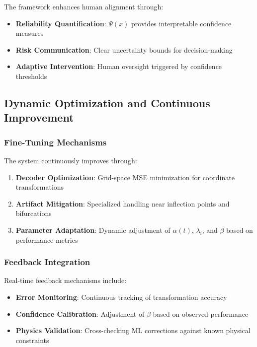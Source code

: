 The framework enhances human alignment through:
\begin{itemize}
    \item \textbf{Reliability Quantification}: $\Psi(x)$ provides interpretable confidence measures
    \item \textbf{Risk Communication}: Clear uncertainty bounds for decision-making
    \item \textbf{Adaptive Intervention}: Human oversight triggered by confidence thresholds
\end{itemize}

\subsection{Dynamic Optimization and Continuous Improvement}

\subsubsection{Fine-Tuning Mechanisms}

The system continuously improves through:
\begin{enumerate}
    \item \textbf{Decoder Optimization}: Grid-space MSE minimization for coordinate transformations
    \item \textbf{Artifact Mitigation}: Specialized handling near inflection points and bifurcations
    \item \textbf{Parameter Adaptation}: Dynamic adjustment of $\alpha(t)$, $\lambda_i$, and $\beta$ based on performance metrics
\end{enumerate}

\subsubsection{Feedback Integration}

Real-time feedback mechanisms include:
\begin{itemize}
    \item \textbf{Error Monitoring}: Continuous tracking of transformation accuracy
    \item \textbf{Confidence Calibration}: Adjustment of $\beta$ based on observed performance
    \item \textbf{Physics Validation}: Cross-checking ML corrections against known physical constraints
\end{itemize}

